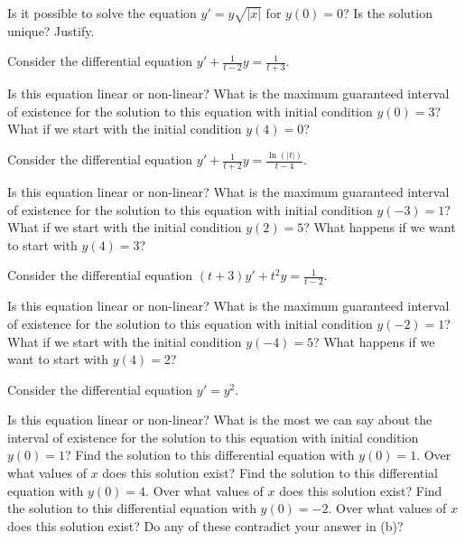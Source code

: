 \begin{exercise}
Is it possible to solve the equation $y' = y\sqrt{\lvert x\rvert}$ for
$y(0) = 0$?  Is the solution unique?
Justify.
\end{exercise}

\begin{exercise}
Consider the differential equation $y' + \frac{1}{t-2}y = \frac{1}{t+3}$. 
\begin{tasks}
\task Is this equation linear or non-linear?
\task What is the maximum guaranteed interval of existence for the solution to this equation with initial condition $y(0) = 3$?
\task What if we start with the initial condition $y(4) = 0$?
\end{tasks}
\end{exercise}

\begin{exercise}
Consider the differential equation $y' + \frac{1}{t+2}y = \frac{\ln(|t|)}{t-4}$. 
\begin{tasks}
\task Is this equation linear or non-linear?
\task What is the maximum guaranteed interval of existence for the solution to this equation with initial condition $y(-3) = 1$?
\task What if we start with the initial condition $y(2) = 5$?
\task What happens if we want to start with $y(4) = 3$?
\end{tasks}
\end{exercise}

\begin{exercise}
Consider the differential equation $(t+3)y' + t^2 y = \frac{1}{t-2}$. 
\begin{tasks}
\task Is this equation linear or non-linear?
\task What is the maximum guaranteed interval of existence for the solution to this equation with initial condition $y(-2) = 1$?
\task What if we start with the initial condition $y(-4) = 5$?
\task What happens if we want to start with $y(4) = 2$?
\end{tasks}
\end{exercise}

\begin{exercise}
Consider the differential equation $y' = y^2$. 
\begin{tasks}
\task Is this equation linear or non-linear?
\task What is the most we can say about the interval of existence for the solution to this equation with initial condition $y(0) = 1$?
\task Find the solution to this differential equation with $y(0) = 1$. Over what values of $x$ does this solution exist?
\task Find the solution to this differential equation with $y(0) = 4$. Over what values of $x$ does this solution exist?
\task Find the solution to this differential equation with $y(0) = -2$. Over what values of $x$ does this solution exist?
\task Do any of these contradict your answer in (b)? 
\end{tasks}
\end{exercise}

